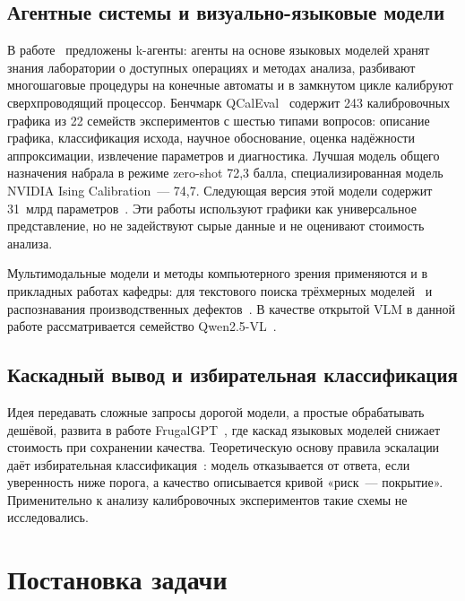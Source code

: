 \documentclass{misisarticle}
\begin{document}
\subsection{Агентные системы и визуально-языковые модели}

В работе~\cite{cao2025kagents} предложены k-агенты: агенты на основе языковых моделей хранят знания лаборатории о доступных операциях и методах анализа, разбивают многошаговые процедуры на конечные автоматы и в замкнутом цикле калибруют сверхпроводящий процессор. Бенчмарк QCalEval~\cite{cao2026qcaleval} содержит 243 калибровочных графика из 22 семейств экспериментов с шестью типами вопросов: описание графика, классификация исхода, научное обоснование, оценка надёжности аппроксимации, извлечение параметров и диагностика. Лучшая модель общего назначения набрала в режиме zero-shot 72{,}3 балла, специализированная модель NVIDIA Ising Calibration~--- 74{,}7. Следующая версия этой модели содержит 31~млрд параметров~\cite{nvidia2026ising}. Эти работы используют графики как универсальное представление, но не задействуют сырые данные и не оценивают стоимость анализа.

Мультимодальные модели и методы компьютерного зрения применяются и в прикладных работах кафедры: для текстового поиска трёхмерных моделей~\cite{chetvertkov2026} и распознавания производственных дефектов~\cite{ereshchenko2023}. В качестве открытой VLM в данной работе рассматривается семейство Qwen2.5-VL~\cite{bai2025qwen}.

\subsection{Каскадный вывод и избирательная классификация}

Идея передавать сложные запросы дорогой модели, а простые обрабатывать дешёвой, развита в работе FrugalGPT~\cite{chen2023frugal}, где каскад языковых моделей снижает стоимость при сохранении качества. Теоретическую основу правила эскалации даёт избирательная классификация~\cite{geifman2017}: модель отказывается от ответа, если уверенность ниже порога, а качество описывается кривой «риск~--- покрытие». Применительно к анализу калибровочных экспериментов такие схемы не исследовались.

\section{Постановка задачи}
\end{document}
